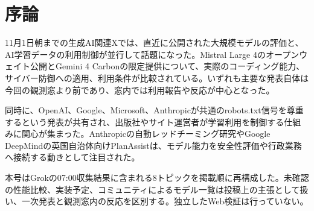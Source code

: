 \section*{序論}
11月1日朝までの生成AI関連Xでは、直近に公開された大規模モデルの評価と、AI学習データの利用制御が並行して話題になった。Mistral Large 4のオープンウェイト公開とGemini 4 Carbonの限定提供について、実際のコーディング能力、サイバー防御への適用、利用条件が比較されている。いずれも主要な発表自体は今回の観測窓より前であり、窓内では利用報告や反応が中心となった。

同時に、OpenAI、Google、Microsoft、Anthropicが共通のrobots.txt信号を尊重するという発表が共有され、出版社やサイト運営者が学習利用を制御する仕組みに関心が集まった。Anthropicの自動レッドチーミング研究やGoogle DeepMindの英国自治体向けPlanAssistは、モデル能力を安全性評価や行政業務へ接続する動きとして注目された。

本号はGrokの07:00収集結果に含まれる8トピックを掲載順に再構成した。未確認の性能比較、実装予定、コミュニティによるモデル一覧は投稿上の主張として扱い、一次発表と観測窓内の反応を区別する。独立したWeb検証は行っていない。
